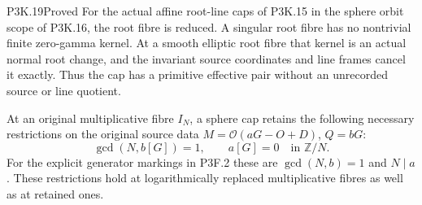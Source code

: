 \begin{statement}{P3K.19}{Proved}
For the actual affine root-line caps of P3K.15 in the sphere
orbit scope of P3K.16, the root fibre is reduced.  A singular
root fibre has no nontrivial finite zero-gamma kernel.  At a
smooth elliptic root fibre that kernel is an actual normal
root change, and the invariant source coordinates and line
frames cancel it exactly.  Thus the cap has a primitive
effective pair without an unrecorded source or line quotient.

At an original multiplicative fibre \(I_N\), a sphere cap
retains the following necessary restrictions on the original
source data \(M=\mathcal O(aG-O+D)\), \(Q=bG\):
\[
              \gcd(N,b[G])=1,
              \qquad a[G]=0\quad\text{in }\mathbb Z/N.       \tag{P3K.19.1}
\]
For the explicit generator markings in P3F.2 these are
\(\gcd(N,b)=1\) and \(N\mid a\).  These restrictions
hold at logarithmically replaced multiplicative fibres as
well as at retained ones.
\end{statement}

